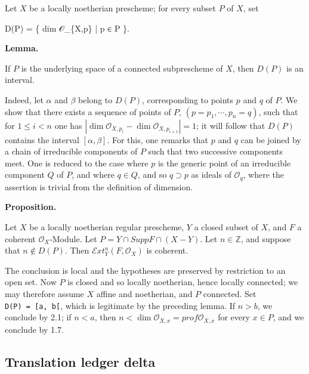 \documentclass[
]{article}
\newenvironment{Shaded}{}{}
\newcommand{\NormalTok}[1]{#1}
\begin{document}
Let \(X\) be a locally noetherian prescheme; for every subset \(P\) of
\(X\), set

\begin{Shaded}
\begin{Highlighting}[]
\NormalTok{D(P) = \{ dim 𝒪\_\{X,p\} | p ∈ P \}.}
\end{Highlighting}
\end{Shaded}

\textbf{Lemma.}

If \(P\) is the underlying space of a connected subprescheme of \(X\),
then \(D(P)\) is an interval.

Indeed, let \(\alpha\) and \(\beta\) belong to \(D(P)\), corresponding
to points \(p\) and \(q\) of \(P\). We show that there exists a sequence
of points of \(P\), \((p = p_{1}, \cdots, p_{n} = q)\), such that for
\(1 \leqslant i < n\) one has
\(|\dim \mathcal{O}_{X,p_{i}} - \dim \mathcal{O}_{X,p_{i+1}}| = 1\); it
will follow that \(D(P)\) contains the interval \([\alpha, \beta]\). For
this, one remarks that \(p\) and \(q\) can be joined by a chain of
irreducible components of \(P\) such that two successive components
meet. One is reduced to the case where \(p\) is the generic point of an
irreducible component \(Q\) of \(P\), and where \(q \in Q\), and so
\(q \supset p\) as ideals of \(\mathcal{O}_{q}\), where the assertion is
trivial from the definition of dimension.

\textbf{Proposition.}

Let \(X\) be a locally noetherian regular prescheme, \(Y\) a closed
subset of \(X\), and \(F\) a coherent \(\mathcal{O}_{X}\)-Module. Let
\(P = Y \cap Supp F \cap (X - Y)\). Let \(n \in \mathbb{Z}\), and
suppose that \(n \notin D(P)\). Then
\(\mathcal{E}xt^{n}_{Y}(F, \mathcal{O}_{X})\) is coherent.

The conclusion is local and the hypotheses are preserved by restriction
to an open set. Now \(P\) is closed and so locally noetherian, hence
locally connected; we may therefore assume \(X\) affine and noetherian,
and \(P\) connected. Set \texttt{D(P)\ =\ {[}a,\ b{[}}, which is
legitimate by the preceding lemma. If \(n > b\), we conclude by 2.1; if
\(n < a\), then \(n < \dim \mathcal{O}_{X,x} = prof \mathcal{O}_{X,x}\)
for every \(x \in P\), and we conclude by 1.7.

\subsection{Translation ledger delta}\label{translation-ledger-delta}
\end{document}
